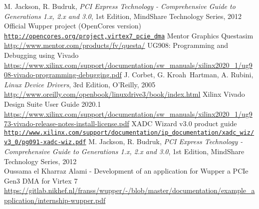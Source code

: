 \begin{thebibliography}{9}
  M. Jackson, R. Budruk, \textit{PCI Express Technology - Comprehensive Guide to Generations 1.x, 2.x and 3.0}, 1st Edition, MindShare Technology Series, 2012\\
  Official Wupper project (OpenCores version)\\
  \href{http://opencores.org/project,virtex7_pcie_dma}{\nolinkurl{http://opencores.org/project,virtex7\_pcie\_dma}}
  Mentor Graphics Questasim\\
  \href{http://www.mentor.com/products/fv/questa/}{http://www.mentor.com/products/fv/questa/}
  UG908: Programming and Debugging using Vivado\\
  \href{https://www.xilinx.com/support/documentation/sw_manuals/xilinx2020_1/ug908-vivado-programming-debugging.pdf}{https://www.xilinx.com/support/documentation/sw\_manuals/xilinx2020\_1/ug908-vivado-programming-debugging.pdf}
  J. Corbet, G. Kroah\ Hartman, A. Rubini, \textit{Linux Device Drivers}, 3rd Edition, O'Reilly, 2005\\
  \href{http://www.oreilly.com/openbook/linuxdrive3/book/index.html}{http://www.oreilly.com/openbook/linuxdrive3/book/index.html}
  Xilinx Vivado Design Suite User Guide 2020.1\\
  \href{https://www.xilinx.com/support/documentation/sw_manuals/xilinx2020_1/ug973-vivado-release-notes-install-license.pdf}{https://www.xilinx.com/support/documentation/sw\_manuals/xilinx2020\_1/ug973-vivado-release-notes-install-license.pdf}
  XADC Wizard v3.0 product guide\\
  \href{http://www.xilinx.com/support/documentation/ip_documentation/xadc_wiz/v3_0/pg091-xadc-wiz.pdf}{\nolinkurl{http://www.xilinx.com/support/documentation/ip\_documentation/xadc\_wiz/v3\_0/pg091-xadc-wiz.pdf}}
 M. Jackson, R. Budruk, \textit{PCI Express Technology - Comprehensive Guide to Generations 1.x, 2.x and 3.0}, 1st Edition, MindShare Technology Series, 2012\\
  Oussama el Kharraz Alami - Development of an application for Wupper a PCIe Gen3 DMA for Virtex 7\\
  \href{https://gitlab.nikhef.nl/franss/wupper/-/blob/master/documentation/example_application/internship-wupper.pdf}{https://gitlab.nikhef.nl/franss/wupper/-/blob/master/documentation/example\_application/internship-wupper.pdf}
\end{thebibliography}
\newpage
{}
\listoffigures
{}
\listoftables
\newpage
